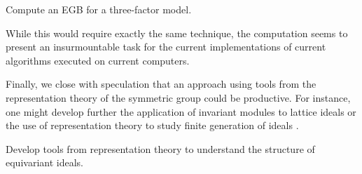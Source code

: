 \begin{problem}
Compute an EGB for a three-factor model.
\end{problem} 

While this would require exactly the same technique, the computation seems to present an insurmountable task for the current implementations of current algorithms executed on current computers.

Finally, we close with speculation that an approach using tools from the representation theory of the symmetric group could be productive.  For instance, one might develop further the application of invariant modules \cite{camina1991some} to lattice ideals \cite{Hillar13} or the use of representation theory to study finite generation of ideals \cite{kemer2008analog}.

 \begin{problem}
 Develop tools from representation theory to understand the structure of equivariant ideals.
 \end{problem}


